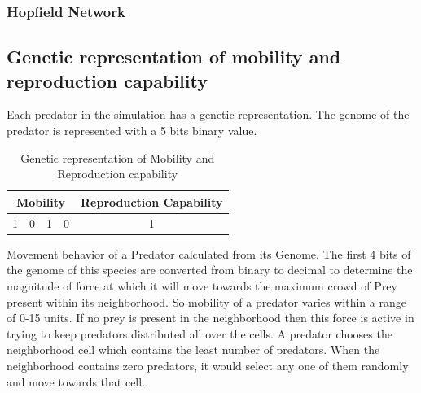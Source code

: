 \subsubsection{Hopfield Network}

\subsection{Genetic representation of mobility and reproduction capability}
Each predator in the simulation has a genetic representation. The genome of the predator is represented with a 5 bits binary value. 

\begin{table}[H]
	\centering
	\begin{tabular}{|c|c|c|c|c|}
		\hline
			\multicolumn{4}{|c|}{Mobility} &	Reproduction Capability \\ \hline
			1	& 0 &	1	& 0 								&	1\\
		\hline
	\end{tabular}
	\caption{Genetic representation of Mobility and Reproduction capability}
	\label{tab:genetic-representation-mobility-reproduction}
\end{table}

Movement behavior of a Predator calculated from its Genome. The first 4 bits of the genome of this species are converted from binary to decimal to determine the magnitude of force at which it will move towards the maximum crowd of Prey present within its neighborhood. So mobility of a predator varies within a range of 0-15 units. If no prey is present in the neighborhood then this force is active in trying to keep predators distributed all over the cells. A predator chooses the neighborhood cell which contains the least number of predators. When the neighborhood contains zero predators, it would select any one of them randomly and move towards that cell.


